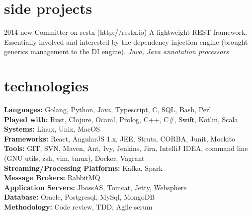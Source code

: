 \documentclass[]{k-cv} %
\begin{document}





\section{side projects}

\begin{entrylist}
\entry
{2014 \to now}
{Committer on restx (http://restx.io)}
{}
{A lightweight REST framework.
Essentially involved and interested by the dependency injection engine (brought generics management to the DI engine).
\emph{Java, Java annotation processors}}
\end{entrylist}

\clearpage



\section{technologies}

\begin{freetext}
{
\textbf{Languages:} Golang, Python, Java, Typescript, C, SQL, Bash, Perl\\
\textbf{Played with:} Rust, Clojure, Ocaml, Prolog, C++, C\#, Swift, Kotlin, Scala\\
\textbf{Systems:} Linux, Unix, MacOS\\
\textbf{Frameworks:} React, AngularJS 1.x, JEE, Struts, CORBA, Junit, Mockito\\
\textbf{Tools:} GIT, SVN, Maven, Ant, Ivy, Jenkins, Jira, IntelliJ IDEA, command line (GNU utils, zsh, vim, tmux), Docker, Vagrant\\
\textbf{Streaming/Processing Platforms:} Kafka, Spark\\
\textbf{Message Brokers:} RabbitMQ\\
\textbf{Application Servers:} JbossAS, Tomcat, Jetty, Websphere\\
\textbf{Database:} Oracle, Postgresql, MySql, MongoDB\\
\textbf{Methodology:} Code review, TDD, Agile scrum\\
}
\end{freetext}
\end{document}
